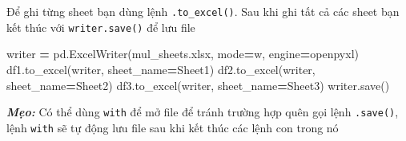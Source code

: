 \documentclass[
]{book}
\makeatletter
\newenvironment{Shaded}{\begin{snugshade}}{\end{snugshade}}
\newcommand{\NormalTok}[1]{#1}
\newcommand{\OperatorTok}[1]{\textcolor[rgb]{0.81,0.36,0.00}{\textbf{#1}}}
\newcommand{\StringTok}[1]{\textcolor[rgb]{0.31,0.60,0.02}{#1}}
\newenvironment{kframe}{%
\medskip{}
\setlength{\fboxsep}{.8em}
 \def\at@end@of@kframe{}%
 \ifinner\ifhmode%
  \def\at@end@of@kframe{\end{minipage}}%
  \begin{minipage}{\columnwidth}%
 \fi\fi%
 \def\FrameCommand##1{\hskip\@totalleftmargin \hskip-\fboxsep
 \colorbox{shadecolor}{##1}\hskip-\fboxsep
     \hskip-\linewidth \hskip-\@totalleftmargin \hskip\columnwidth}%
 \MakeFramed {\advance\hsize-\width
   \@totalleftmargin\z@ \linewidth\hsize
   \@setminipage}}%
 {\par\unskip\endMakeFramed%
 \at@end@of@kframe}
\newenvironment{rmdblock}[1]
  {
  \begin{itemize}
  \renewcommand{\labelitemi}{
    \raisebox{-.7\height}[0pt][0pt]{
      {\setkeys{Gin}{width=3em,keepaspectratio}\texttt{[image: images/\#1]}}
    }
  }
  \setlength{\fboxsep}{1em}
  \begin{kframe}
  \item
  }
  {
  \end{kframe}
  \end{itemize}
  }
\newenvironment{rmdtip}
  {\begin{rmdblock}{tip}}
  {\end{rmdblock}}
\makeatother
\begin{document}
Để ghi từng sheet bạn dùng lệnh \texttt{.to\_excel()}. Sau khi ghi tất cả các sheet bạn kết thúc với \texttt{writer.save()} để lưu file

\begin{Shaded}
\begin{Highlighting}[]
\NormalTok{writer }\OperatorTok{=}\NormalTok{ pd.ExcelWriter(}\StringTok{\textquotesingle{}mul\_sheets.xlsx\textquotesingle{}}\NormalTok{, mode}\OperatorTok{=}\StringTok{\textquotesingle{}w\textquotesingle{}}\NormalTok{, engine}\OperatorTok{=}\StringTok{\textquotesingle{}openpyxl\textquotesingle{}}\NormalTok{)}
\NormalTok{df1.to\_excel(writer, sheet\_name}\OperatorTok{=}\StringTok{\textquotesingle{}Sheet1\textquotesingle{}}\NormalTok{)}
\NormalTok{df2.to\_excel(writer, sheet\_name}\OperatorTok{=}\StringTok{\textquotesingle{}Sheet2\textquotesingle{}}\NormalTok{)}
\NormalTok{df3.to\_excel(writer, sheet\_name}\OperatorTok{=}\StringTok{\textquotesingle{}Sheet3\textquotesingle{}}\NormalTok{)}
\NormalTok{writer.save()}
\end{Highlighting}
\end{Shaded}

\begin{rmdtip}
\textbf{\emph{Mẹo:}}
Có thể dùng \texttt{with} để mở file để tránh trường hợp quên gọi lệnh \texttt{.save()}, lệnh \texttt{with} sẽ tự động lưu file sau khi kết thúc các lệnh con trong nó
\end{rmdtip}
\end{document}

